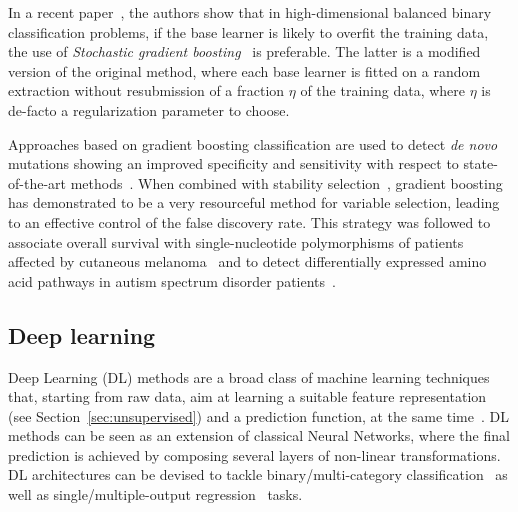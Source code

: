     In a recent paper~\citep{lusa2015boosting}, the authors show that in high-dimensional balanced binary classification problems, if the base learner is likely to overfit the training data, the use of \textit{Stochastic gradient boosting}~\citep{friedman2002stochastic} is preferable. The latter is a modified version of the original method, where each base learner is fitted on a random extraction without resubmission of a fraction $\eta$ of the training data, where $\eta$ is de-facto a regularization parameter to choose.

    Approaches based on gradient boosting classification are used to detect \textit{de novo} mutations showing an improved specificity and sensitivity with respect to state-of-the-art methods~\citep{liu2014gradient}.
    When combined with stability selection~\citep{meinshausen2010stability}, gradient boosting has demonstrated to be a very resourceful method for variable selection, leading to an effective control of the false discovery rate. This strategy was followed to associate overall survival with single-nucleotide polymorphisms of patients affected by cutaneous melanoma~\citep{he2016component} and to detect differentially expressed amino acid pathways in autism spectrum disorder patients~\citep{hofner2015controlling}.







    \subsection{Deep learning}
    Deep Learning (DL) methods are a broad class of machine learning techniques that, starting from raw data, aim at learning a suitable feature representation (see Section~\ref{sec:unsupervised}) and a prediction function, at the same time~\cite{lecun2015deep}. DL methods can be seen as an extension of classical Neural Networks, where the final prediction is achieved by composing several layers of non-linear transformations.
    DL architectures can be devised to tackle binary/multi-category classification~\cite{angermueller2016deep, leung2014deep} as well as single/multiple-output regression~\cite{Chen2016GeneEI, ma2015deep} tasks.

